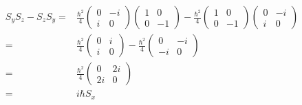 \begin{enumerate}
    \begin{align*}
        S_yS_z 
        -S_zS_y
    =&
    \frac{\hbar^2}{4}
    \begin{pmatrix}
    0 & -i \\
    i & 0
    \end{pmatrix}
    \begin{pmatrix}
    1 & 0 \\
    0 & -1
    \end{pmatrix}
    -
    \frac{\hbar^2}{4}
    \begin{pmatrix}
    1 & 0 \\
    0 & -1
    \end{pmatrix}
    \begin{pmatrix}
    0 & -i \\
    i & 0
    \end{pmatrix}\\
    =&
    \frac{\hbar^2}{4}
    \begin{pmatrix}
        0 & i\\
        i & 0
    \end{pmatrix}
    -
    \frac{\hbar^2}{4}
    \begin{pmatrix}
        0 & -i\\
        -i & 0
    \end{pmatrix}
    \\
    =&
    \frac{\hbar^2}{4}
    \begin{pmatrix}
        0 & 2i\\
        2i & 0
    \end{pmatrix}\\
    =&i\hbar S_x
    \end{align*}


\end{enumerate}
